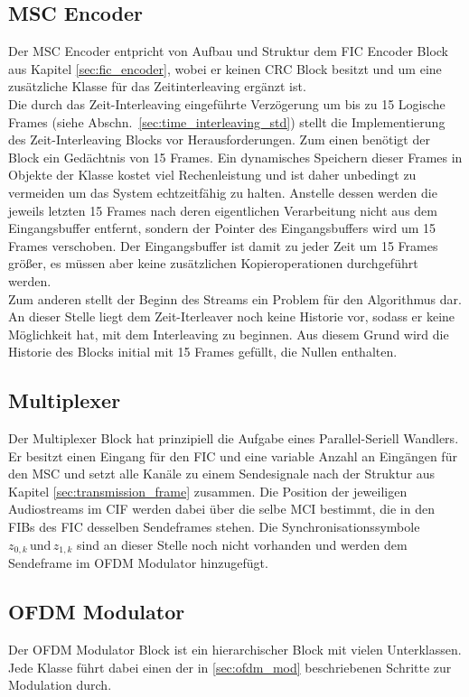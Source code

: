 \subsection{MSC Encoder}
Der MSC Encoder entpricht von Aufbau und Struktur dem FIC Encoder Block aus Kapitel \ref{sec:fic_encoder}, wobei er keinen CRC Block besitzt und um eine zusätzliche Klasse für das Zeitinterleaving ergänzt ist.\\
Die durch das Zeit-Interleaving eingeführte Verzögerung um bis zu 15 Logische Frames (siehe Abschn.~\ref{sec:time_interleaving_std}) stellt die Implementierung des Zeit-Interleaving Blocks vor Herausforderungen. Zum einen benötigt der Block ein Gedächtnis von 15 Frames. Ein dynamisches Speichern dieser Frames in Objekte der Klasse kostet viel Rechenleistung und ist daher unbedingt zu vermeiden um das System echtzeitfähig zu halten. Anstelle dessen werden die jeweils letzten 15 Frames nach deren eigentlichen Verarbeitung nicht aus dem Eingangsbuffer entfernt, sondern der Pointer des Eingangsbuffers wird um 15 Frames verschoben. Der Eingangsbuffer ist damit zu jeder Zeit um 15 Frames größer, es müssen aber keine zusätzlichen Kopieroperationen durchgeführt werden.\\
Zum anderen stellt der Beginn des Streams ein Problem für den Algorithmus dar. An dieser Stelle liegt dem Zeit-Iterleaver noch keine Historie vor, sodass er keine Möglichkeit hat, mit dem Interleaving zu beginnen. Aus diesem Grund wird die Historie des Blocks initial mit 15 Frames gefüllt, die Nullen enthalten.

\subsection{Multiplexer}
Der Multiplexer Block hat prinzipiell die Aufgabe eines Parallel-Seriell Wandlers. Er besitzt einen Eingang für den FIC und eine variable Anzahl an Eingängen für den MSC und setzt alle Kanäle zu einem Sendesignale nach der Struktur aus Kapitel \ref{sec:transmission_frame} zusammen. Die Position der jeweiligen Audiostreams im CIF werden dabei über die selbe MCI bestimmt, die in den FIBs des FIC desselben Sendeframes stehen. Die Synchronisationssymbole $z_{0,k}\, \text{und}\, z_{1,k}$ sind an dieser Stelle noch nicht vorhanden und werden dem Sendeframe im OFDM Modulator hinzugefügt.

\subsection{OFDM Modulator}
Der OFDM Modulator Block ist ein hierarchischer Block mit vielen Unterklassen. Jede Klasse führt dabei einen der in \ref{sec:ofdm_mod} beschriebenen Schritte zur Modulation durch.

